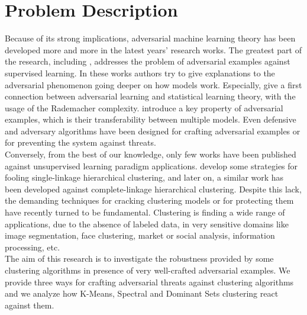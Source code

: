 \section{Problem Description}
Because of its strong implications, adversarial machine learning theory has been developed more and more in the latest years' research works. The greatest part of the research, including \cite{evasionattacks,adversarialexamples,  PapernoTransferability,rademacher}, addresses the problem of adversarial examples against supervised learning. In these works authors try to give explanations to the adversarial phenomenon going deeper on how models work. Especially, \citeauthor{rademacher} give a first connection between adversarial learning and statistical learning theory, with the usage of the Rademacher complexity. \citeauthor{PapernoTransferability} introduce a key property of adversarial examples, which is their transferability between multiple models. Even defensive and adversary algorithms have been designed for crafting adversarial examples or for preventing the system against threats.\\
Conversely, from the best of our knowledge, only few works have been published against unsupervised learning paradigm applications. \citeauthor{isdataclustering} develop some strategies for fooling single-linkage hierarchical clustering, and later on, a similar work \cite{poisonclustering} has been developed against complete-linkage hierarchical clustering.
Despite this lack, the demanding techniques for cracking clustering models or for protecting them have recently turned to be fundamental. Clustering is finding a wide range of applications, due to the absence of labeled data, in very sensitive domains like image segmentation, face clustering, market or social analysis, information processing, etc.\\
The aim of this research is to investigate the robustness provided by some clustering algorithms in presence of very well-crafted adversarial examples. We provide three ways for crafting adversarial threats against clustering algorithms and we analyze how K-Means, Spectral and Dominant Sets clustering react against them.


